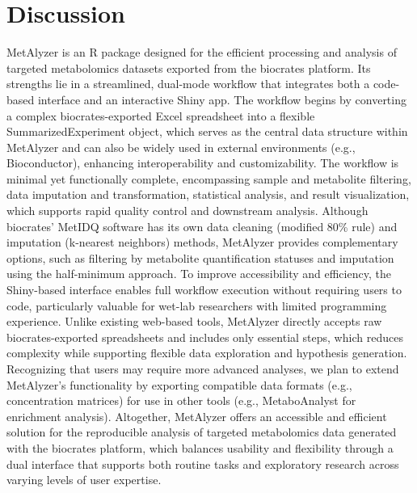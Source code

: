 \documentclass[12pt, a4paper]{article}
\begin{document}

\section*{\large Discussion}
MetAlyzer is an R package designed for the efficient processing and analysis of targeted metabolomics datasets exported from the biocrates platform. Its strengths lie in a streamlined, dual-mode workflow that integrates both a code-based interface and an interactive Shiny app. The workflow begins by converting a complex biocrates-exported Excel spreadsheet into a flexible SummarizedExperiment object\cite{Morgan2022}, which serves as the central data structure within MetAlyzer and can also be widely used in external environments (e.g., Bioconductor\cite{Huber2015}), enhancing interoperability and customizability. The workflow is minimal yet functionally complete, encompassing sample and metabolite filtering, data imputation and transformation, statistical analysis, and result visualization, which supports rapid quality control and downstream analysis. Although biocrates' MetIDQ software has its own data cleaning (modified 80\% rule\cite{Wei2018}) and imputation (k-nearest neighbors) methods, MetAlyzer provides complementary options, such as filtering by metabolite quantification statuses and imputation using the half-minimum approach. To improve accessibility and efficiency, the Shiny-based interface enables full workflow execution without requiring users to code, particularly valuable for wet-lab researchers with limited programming experience. Unlike existing web-based tools\cite{Pang2024,Galaxy2024,MWB}, MetAlyzer directly accepts raw biocrates-exported spreadsheets and includes only essential steps, which reduces complexity while supporting flexible data exploration and hypothesis generation. Recognizing that users may require more advanced analyses, we plan to extend MetAlyzer's functionality by exporting compatible data formats (e.g., concentration matrices) for use in other tools (e.g., MetaboAnalyst for enrichment analysis\cite{Xia2010}). Altogether, MetAlyzer offers an accessible and efficient solution for the reproducible analysis of targeted metabolomics data generated with the biocrates platform, which balances usability and flexibility through a dual interface that supports both routine tasks and exploratory research across varying levels of user expertise.
\end{document}
